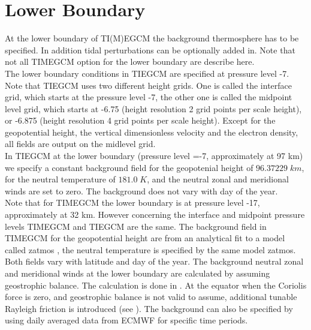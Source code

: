 \section{Lower Boundary}
%
At the lower boundary of TI(M)EGCM the background thermosphere has to be specified.
In addition tidal perturbations can be optionally added in. Note that not all TIMEGCM option for the lower
boundary are describe here.\\

%
The lower boundary conditions in TIEGCM are specified at pressure level 
-7. Note that TIEGCM uses two different height grids. One is called the
interface grid, which starts at the pressure level -7, the other one is called the
midpoint level grid, which starts at -6.75 (height resolution 2 grid points per
scale height), or -6.875 (height resolution 4 grid points per
scale height). Except for the geopotential height, the vertical dimensionless
velocity and the electron density, all fields are output on the midlevel grid. \\

In TIEGCM at the lower boundary (pressure level =-7, approximately at 97 km) we specify a 
constant background 
field for the geopotenial height of $96.37229 \;  km$,
for the neutral temperature of $181.0 \; K$, and the neutral zonal and meridional 
winds are set to zero. The background does not vary with day of the year.\\

Note that for TIMEGCM the lower boundary is at pressure level -17, 
approximately at 32 km. However concerning the interface and midpoint 
pressure levels TIMEGCM and TIEGCM are the same. The background field in TIMEGCM
for the geopotential height are from an analytical fit to a model called zatmos
, the neutral temperature is specified by
the same model zatmos. Both fields vary with latitude and day of the year. 
The background neutral zonal and meridional winds at the lower
boundary are calculated by assuming geostrophic balance. The calculation is done in
 . At the equator when the Coriolis force
is zero, and geostrophic balance is not valid to assume, additional 
tunable Rayleigh friction is introduced (see ).
The background can also be specified by using daily averaged data from ECMWF for 
specific time periods.  \\

